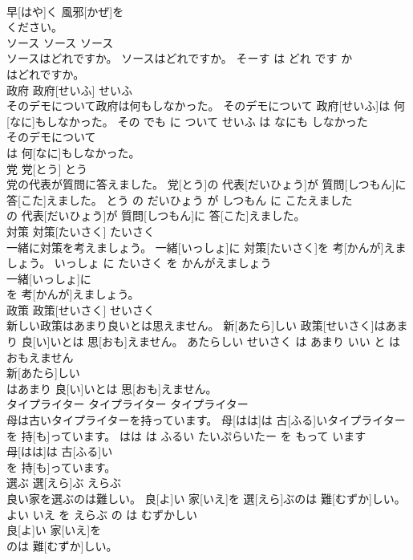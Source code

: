 \documentclass[8pt]{extreport}
\begin{document}
\begin{CJK}{UTF8}{min}
\\	早[はや]く 風邪[かぜ]を
\\	ください。			
\\	ソース	ソース	ソース	
\\	ソースはどれですか。	ソースはどれですか。	そーす は どれ です か	
\\	はどれですか。			
\\	政府	政府[せいふ]	せいふ	
\\	そのデモについて政府は何もしなかった。	そのデモについて 政府[せいふ]は 何[なに]もしなかった。	その でも に ついて せいふ は なにも しなかった	
\\	そのデモについて
\\	は 何[なに]もしなかった。			
\\	党	党[とう]	とう	
\\	党の代表が質問に答えました。	党[とう]の 代表[だいひょう]が 質問[しつもん]に 答[こた]えました。	とう の だいひょう が しつもん に こたえました	
\\	の 代表[だいひょう]が 質問[しつもん]に 答[こた]えました。			
\\	対策	対策[たいさく]	たいさく	
\\	一緒に対策を考えましょう。	一緒[いっしょ]に 対策[たいさく]を 考[かんが]えましょう。	いっしょ に たいさく を かんがえましょう	
\\	一緒[いっしょ]に
\\	を 考[かんが]えましょう。			
\\	政策	政策[せいさく]	せいさく	
\\	新しい政策はあまり良いとは思えません。	新[あたら]しい 政策[せいさく]はあまり 良[い]いとは 思[おも]えません。	あたらしい せいさく は あまり いい と は おもえません	
\\	新[あたら]しい
\\	はあまり 良[い]いとは 思[おも]えません。			
\\	タイプライター	タイプライター	タイプライター	
\\	母は古いタイプライターを持っています。	母[はは]は 古[ふる]いタイプライターを 持[も]っています。	はは は ふるい たいぷらいたー を もって います	
\\	母[はは]は 古[ふる]い
\\	を 持[も]っています。			
\\	選ぶ	選[えら]ぶ	えらぶ	
\\	良い家を選ぶのは難しい。	良[よ]い 家[いえ]を 選[えら]ぶのは 難[むずか]しい。	よい いえ を えらぶ の は むずかしい	
\\	良[よ]い 家[いえ]を
\\	のは 難[むずか]しい。			

\end{CJK}
\end{document}
